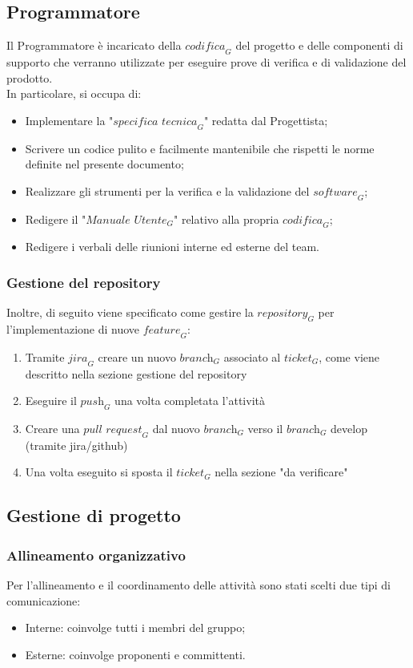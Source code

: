 \subsection{Programmatore}
Il Programmatore è incaricato della $\textit{codifica}_G$ del progetto e delle componenti di supporto che verranno utilizzate per eseguire prove di verifica e di validazione del prodotto. \\
In particolare, si occupa di:
\begin{itemize}
    \item Implementare la "$\textit{specifica tecnica}_G$" redatta dal Progettista;
    \item Scrivere un codice pulito e facilmente mantenibile che rispetti le norme definite nel presente documento;
    \item Realizzare gli strumenti per la verifica e la validazione del $\textit{software}_G$;
    \item Redigere il "$\textit{Manuale Utente}_G$" relativo alla propria $\textit{codifica}_G$;
    \item Redigere i verbali delle riunioni interne ed esterne del team.
\end{itemize}
\subsubsection{Gestione del repository}
Inoltre, di seguito viene specificato come gestire la $\textit{repository}_G$ per l'implementazione di nuove $\textit{feature}_G$:
\begin{enumerate}
    \item Tramite $\textit{jira}_G$ creare un nuovo $\textit{branch}_G$ associato al $\textit{ticket}_G$, come viene descritto nella sezione gestione del repository
    \item Eseguire il $\textit{push}_G$ una volta completata l'attività
    \item Creare una $\textit{pull request}_G$ dal nuovo $\textit{branch}_G$ verso il $\textit{branch}_G$ develop (tramite jira/github)
    \item Una volta eseguito si sposta il $\textit{ticket}_G$ nella sezione "da verificare"
\end{enumerate}
\subsection{Gestione di progetto}
\subsubsection{Allineamento organizzativo}
Per l'allineamento e il coordinamento delle attività sono stati scelti due tipi di comunicazione:
\begin{itemize}
    \item Interne: coinvolge tutti i membri del gruppo;
    \item Esterne: coinvolge proponenti e committenti.
\end{itemize}

